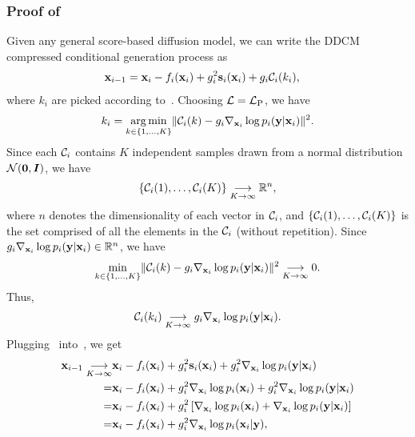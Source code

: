 \subsubsection{Proof of~}
Given any general score-based diffusion model, we can write the DDCM compressed conditional generation process as
\begin{align}
    &{\mathbf{x}}_{i-1}={\mathbf{x}}_{i}-f_{i}({\mathbf{x}}_{i})+g_{i}^{2}{\mathbf{s}}_{i}({\mathbf{x}}_{i})+g_{i}{\mathcal{C}}_{i}(k_{i}),\label{eq:score-based-ddcm}
\end{align}
where $k_{i}$ are picked according to~.
Choosing ${\mathcal{L}}={\mathcal{L}}_{\text{P}}$, we have
\begin{align}
    k_{i}=\operatorname*{arg\,min}_{k\in\{1,\hdots,K\}}\lVert{\mathcal{C}}_{i}(k)-g_{i}\nabla_{{\mathbf{x}}_{i}}\log{p_{i}({\mathbf{y}}|{\mathbf{x}}_{i})}\rVert^{2}.
\end{align}
Since each ${\mathcal{C}}_{i}$ contains $K$ independent samples drawn from a normal distribution ${\mathcal{N}}({\bm{0}},{\bm{I}})$, we have
\begin{align}
    \{{\mathcal{C}}_{i}(1),\hdots,{\mathcal{C}}_{i}(K)\}\underset{K\rightarrow\infty}{\longrightarrow}\mathbb{R}^{n},
\end{align}
where $n$ denotes the dimensionality of each vector in ${\mathcal{C}}_{i}$, and $\{{\mathcal{C}}_{i}(1),\hdots,{\mathcal{C}}_{i}(K)\}$ is the set comprised of all the elements in the ${\mathcal{C}}_{i}$ (without repetition).
Since $g_{i}\nabla_{{\mathbf{x}}_{i}}\log{p_{i}({\mathbf{y}}|{\mathbf{x}}_{i})}\in\mathbb{R}^{n}$, we have
\begin{align}
    \min_{k\in\{1,\hdots,K\}}\lVert{\mathcal{C}}_{i}(k)-g_{i}\nabla_{{\mathbf{x}}_{i}}\log{p_{i}({\mathbf{y}}|{\mathbf{x}}_{i})}\rVert^{2}\underset{K\rightarrow\infty}{\longrightarrow}0.
\end{align}
Thus,
\begin{align}
    {\mathcal{C}}_{i}(k_{i})\underset{K\rightarrow\infty}{\longrightarrow}g_{i}\nabla_{{\mathbf{x}}_{i}}\log{p_{i}({\mathbf{y}}|{\mathbf{x}}_{i})}.\label{eq:noise_convergence_to_grad}
\end{align}
Plugging~ into~, we get
\begin{align}
    {\mathbf{x}}_{i-1}\underset{K\rightarrow\infty}{\longrightarrow}&{\mathbf{x}}_{i}-f_{i}({\mathbf{x}}_{i})+g_{i}^{2}{\mathbf{s}}_{i}({\mathbf{x}}_{i})+g_{i}^{2}\nabla_{{\mathbf{x}}_{i}}\log{p_{i}({\mathbf{y}}|{\mathbf{x}}_{i})}\\
    =&{\mathbf{x}}_{i}-f_{i}({\mathbf{x}}_{i})+g_{i}^{2}\nabla_{{\mathbf{x}}_{i}}\log{p_{i}({\mathbf{x}}_{i})}+g_{i}^{2}\nabla_{{\mathbf{x}}_{i}}\log{p_{i}({\mathbf{y}}|{\mathbf{x}}_{i})}\\
    =&{\mathbf{x}}_{i}-f_{i}({\mathbf{x}}_{i})+g_{i}^{2}\left[\nabla_{{\mathbf{x}}_{i}}\log{p_{i}({\mathbf{x}}_{i})}+\nabla_{{\mathbf{x}}_{i}}\log{p_{i}({\mathbf{y}}|{\mathbf{x}}_{i})}\right]\\
    =&{\mathbf{x}}_{i}-f_{i}({\mathbf{x}}_{i})+g_{i}^{2}\nabla_{{\mathbf{x}}_{i}}\log{p_{i}({\mathbf{x}}_{i}|{\mathbf{y}})},\label{eq:bayes_rule_for_ode}
\end{align}
